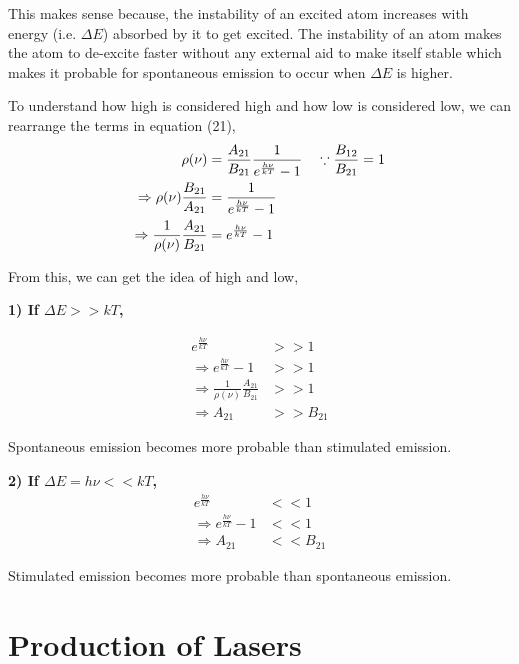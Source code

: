 \documentclass[12pt]{article}
\begin{document}
This makes sense because, the instability of an excited atom increases with energy (i.e. $\Delta E$) absorbed by it to get excited. The instability of an atom makes the atom to de-excite faster without any external aid to make itself stable which makes it probable for spontaneous emission to occur when $\Delta E$ is higher. \vspace{.2cm}

To understand how high is considered high and how low is considered low, we can rearrange the terms in equation (21),
\begin{align}
    \rho(\nu) & = \frac{A_{21}}{B_{21}} \frac{1}{e^\frac{h\nu}{kT} - 1} \quad \because \frac{B_{12}}{B_{21}} = 1 \notag \\
    \Rightarrow \rho(\nu) \frac{B_{21}}{A_{21}} & = \frac{1}{e^\frac{h\nu}{kT} - 1} \notag \\
    \Rightarrow \frac{1}{\rho(\nu)} \frac{A_{21}}{B_{21}} & = e^\frac{h\nu}{kT} - 1
\end{align} \vspace{.2cm}

From this, we can get the idea of high and low,
\begin{block}
    \textbf{1) If $\Delta E >> kT$,}

    \begin{block}[left=1cm, top=-.5cm]
        \begin{align*}
            e^{\frac{h\nu}{kT}} & >> 1 \\
            \Rightarrow e^{\frac{h\nu}{kT}} - 1 & >> 1 \\
            \Rightarrow \frac{1}{\rho(\nu)} \frac{A_{21}}{B_{21}} & >> 1 \\
            \Rightarrow A_{21} & >> B_{21}
        \end{align*}

        Spontaneous emission becomes more probable than stimulated emission.
    \end{block} \vspace{.2cm}

    \textbf{2) If $\Delta E = h\nu << kT$,}
    \begin{align*}
        e^{\frac{h\nu}{kT}} & << 1 \\
        \Rightarrow e^{\frac{h\nu}{kT}} - 1 & << 1 \\
        \Rightarrow A_{21} & << B_{21}
    \end{align*}

    Stimulated emission becomes more probable than spontaneous emission.
\end{block}

\section{Production of Lasers}
\end{document}
